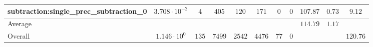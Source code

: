 \begin{tabular}{|l|c|c|c|c|c|c|c|c|c|c|}
subtraction:single\_prec\_subtraction\_0         & $ 3.708 \cdot 10^{-2} $ & $ 4      $ & $ 405  $ & $ 120  $ & $ 171   $ & $ 0  $ & $ 0 $ & $ 107.87      $ & $ 0.73    $ & $ 9.12    $ \\
\hline
Average                                          & $                     $ & $        $ & $      $ & $      $ & $       $ & $    $ & $   $ & $ 114.79      $ & $ 1.17    $ & $         $ \\
\hline
Overall                                          & $ 1.146 \cdot 10^{0}  $ & $ 135    $ & $ 7499 $ & $ 2542 $ & $ 4476  $ & $ 77 $ & $ 0 $ & $             $ & $         $ & $ 120.76  $ \\
\hline
\end{tabular}
